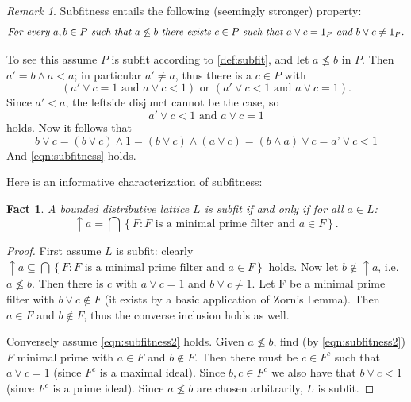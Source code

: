 \documentclass{article}
\theoremstyle{plain}
\newtheorem{fact}[theorem]{Fact}
\theoremstyle{definition}
\theoremstyle{remark}
\newtheorem{remark}[theorem]{Remark}
\newcommand{\bp}[1]{\left\lbrace #1 \right\rbrace}
\newcommand{\0}{\mathbbm 0}
\newcommand{\1}{\mathbbm 1}
\newcommand{\2}{\mathbbm 2}
\begin{document}
\begin{remark} \label{rem:subfitness}
Subfitness entails the following (seemingly stronger) property:
\begin{equation}\label{eqn:subfitness}
\text{\it{For every  $a,b \in P$ such that $a \not \leq b$ there exists $c \in P$ such that $a \vee c= 1_P$ and $b \vee c \neq 1_P $.}}
\end{equation}

To see this assume $P$ is subfit according to \ref{def:subfit}, and
let $a \nleq b$ in $P$. Then $a'=b\wedge a< a$; in particular $a'\neq a$, thus there is a $c\in P$ with
\[
(a' \vee c=1 \text{ and } a \vee c < 1) \text{ or } (a' \vee c<1 \text{ and }a \vee c=1).
\]
Since $a'< a$, the leftside disjunct cannot be the case, so
\[
a' \vee c<1 \text{ and }a \vee c=1
\]
holds.
Now it follows that
\[
b\vee c = (b\vee c)\wedge 1 = (b\vee c)\wedge(a \vee c)
= (b \wedge a)\vee c = a’ \vee c <1
\]
And \ref{eqn:subfitness} holds.
\end{remark}

Here is an informative characterization of subfitness:
\begin{fact}
\label{fact:charsubfitness}
A bounded distributive lattice $L$ is subfit if and only if for all $a\in L$:
\begin{equation}\label{eqn:subfitness2}
\uparrow a = \bigcap \bp{ F : F \text{ is a minimal prime filter and } a\in F}.
\end{equation}
\end{fact}
\begin{proof}
First assume $L$ is subfit: clearly $\uparrow a \subseteq \bigcap \bp{ F : F \text{ is a minimal prime filter and } a\in F}$ holds.
Now let $b\not\in\uparrow a$, i.e. $a\nleq b$. Then there is $c$ with 
$a\vee c=1$ and $b\vee c\neq 1$. Let F be a minimal prime filter with $b\vee c \not\in F$ (it exists by a basic application of Zorn's Lemma). Then $a\in F$ and $ b\not\in F$, thus the converse inclusion holds as well.

Conversely assume \ref{eqn:subfitness2} holds. Given $a\nleq b$, find (by \ref{eqn:subfitness2}) $F$ minimal prime with $a\in F$ and $b\notin F$.
Then there must be $c\in F^c$ such that $a\vee c=1$ (since $F^c$ is a maximal ideal). Since $b,c\in F^c$ we also have that $b\vee c<1$ (since $F^c$ is a prime ideal). Since $a\nleq b$ are chosen arbitrarily, $L$ is subfit.
\end{proof}
\end{document}
